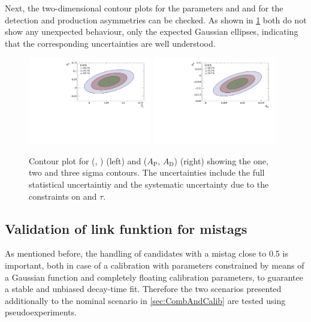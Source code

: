 Next, the two-dimensional contour plots for the \CP parameters \Sf and \Sfbar and for the detection and production asymmetries can be checked.
As shown in \cref{fig:corrPlots} both do not show any unexpected behaviour, only the expected Gaussian ellipses, indicating that the corresponding uncertainties are well understood.
\begin{figure}[tbp]
    \centering
    \includegraphics[width=0.48\textwidth]{09TimeFit/figs/SfvsSfbar.pdf}
    \includegraphics[width=0.48\textwidth]{09TimeFit/figs/ApvsAd.pdf}
    \caption{Contour plot for (\Sf, \Sfbar) (left) and ($A_{\text{P}}$, $A_{\text{D}}$) (right) showing the one, two and three sigma contours.
    The uncertainties include the full statistical uncertaintiy and the systematic uncertainty due to the constraints on \dm and $\tau$.}
    \label{fig:corrPlots}
\end{figure}

\subsection{Validation of link funktion for mistags}
\label{sec:ValLinkFunction}

As mentioned before, the handling of candidates with a mistag close to \num{0.5} is important, both in case of a calibration with parameters constrained by means of a Gaussian function and completely floating calibration parameters, to guarantee a stable and unbiased decay-time fit.
Therefore the two scenarios presented additionally to the nominal scenario in \cref{sec:CombAndCalib} are tested using pseudoexperiments.

